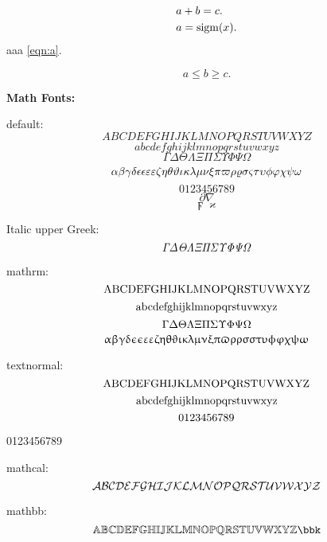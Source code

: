 \documentclass{article}
\begin{document}
\begin{align}
  & a + b = c. \\
  & a = \sigm(x).
  \label{eqn:a}
\end{align}
aaa \eqref{eqn:a}. \ie{} \eg{} \etc{} \etal

\[
  a \le b \ge c.
\]

\textbf{Math Fonts:}

default:
\[ A B C D E F G H I J K L M N O P Q R S T U V W X Y Z \]
\[ a b c d e f g h i j k l m n o p q r s t u v w x y z \]
\[ \Gamma \Delta \Theta \Lambda \Xi \Pi \Sigma \Upsilon \Phi \Psi \Omega \]
\[ \alpha \beta \gamma \delta \epsilon \eps \varepsilon \veps \zeta \eta \theta \vartheta \iota \kappa \lambda \mu \nu \xi \pi \varpi \rho \varrho \sigma \varsigma \tau \upsilon \phi \varphi \chi \psi \omega \]
\[0123456789\]
\[ \partial \nabla \]
\[ \digamma \varkappa \]

Italic upper Greek:
\[ \itGamma \itDelta \itTheta \itLambda \itXi \itPi \itSigma \itUpsilon \itPhi \itPsi \itOmega \]

mathrm:
\[ \rmA \rmB \rmC \rmD \rmE \rmF \rmG \rmH \rmI \rmJ \rmK \rmL \rmM \rmN \rmO \rmP \rmQ \rmR \rmS \rmT \rmU \rmV \rmW \rmX \rmY \rmZ \]
\[ \rmaa \rmbb \rmcc \rmdd \rmee \rmff \rmgg \rmhh \rmii \rmjj \rmkk \rmll \rmmm \rmnn \rmoo \rmpp \rmqq \rmrr \rmss \rmtt \rmuu \rmvv \rmww \rmxx \rmyy \rmzz \]
\[ \rmGamma \rmDelta \rmTheta \rmLambda \rmXi \rmPi \rmSigma \rmUpsilon \rmPhi \rmPsi \rmOmega \]
\[ \rmalpha \rmbeta \rmgamma \rmdelta \rmepsilon \rmeps \rmvarepsilon \rmveps \rmzeta \rmeta \rmtheta \rmvartheta \rmiota \rmkappa \rmlambda \rmmu \rmnu \rmxi \rmpi \rmvarpi \rmrho \rmvarrho \rmsigma \rmvarsigma \rmtau \rmupsilon \rmphi \rmvarphi \rmchi \rmpsi \rmomega \]

textnormal:
\[ \tnA \tnB \tnC \tnD \tnE \tnF \tnG \tnH \tnI \tnJ \tnK \tnL \tnM \tnN \tnO \tnP \tnQ \tnR \tnS \tnT \tnU \tnV \tnW \tnX \tnY \tnZ \]
\[ \tnaa \tnbb \tncc \tndd \tnee \tnff \tngg \tnhh \tnii \tnjj \tnkk \tnll \tnmm \tnnn \tnoo \tnpp \tnqq \tnrr \tnss \tntt \tnuu \tnvv \tnww \tnxx \tnyy \tnzz \]
\[ \tnzro \tnone \tntwo \tnthr \tnfor \tnfiv \tnsix \tnsev \tneit \tnnin \]
\begin{center}
  0123456789
\end{center}

mathcal:
\[ \clA \clB \clC \clD \clE \clF \clG \clH \clI \clJ \clK \clL \clM \clN \clO \clP \clQ \clR \clS \clT \clU \clV \clW \clX \clY \clZ \]

mathbb:
\[ \bbA \bbB \bbC \bbD \bbE \bbF \bbG \bbH \bbI \bbJ \bbK \bbL \bbM \bbN \bbO \bbP \bbQ \bbR \bbS \bbT \bbU \bbV \bbW \bbX \bbY \bbZ \bbk \]
\end{document}
